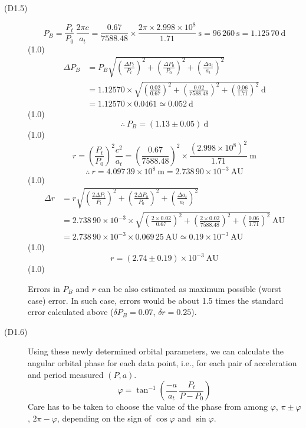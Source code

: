 \begin{description}
\item[(D1.5)]
  \[ P_B = \frac{P_t}{P_0}\,\frac{2\pi c}{a_t}
     = \frac{0.67}{7588.48} \times
       \frac{2\pi \times 2.998 \times 10^8}{1.71}\ \mathrm{s}
     = 96\,260\ \mathrm{s} = 1.125\,70\ \mathrm{d} \]
  \hfill(1.0)
  \begin{align*}
    \Delta P_B &= P_B \sqrt{
      \left( \frac{\Delta P_t}{P_t} \right)^2
      + \left( \frac{\Delta P_0}{P_0} \right)^2
      + \left( \frac{\Delta a_t}{a_t} \right)^2 } \\
    &= 1.12570 \times \sqrt{
      \left( \frac{0.02}{0.67} \right)^2
      + \left( \frac{0.02}{7588.48} \right)^2
      + \left( \frac{0.06}{1.71} \right)^2 }\ \mathrm{d} \\
    &= 1.12570 \times 0.0461 \simeq 0.052\ \mathrm{d}
  \end{align*}
  \hfill(1.0)
  \[ \therefore\ P_B = (1.13 \pm 0.05)\ \mathrm{d} \]
  \hfill(1.0)
  \[ r = \left( \frac{P_t}{P_0} \right)^2 \frac{c^2}{a_t}
     = \left( \frac{0.67}{7588.48} \right)^2 \times
       \frac{\left( 2.998 \times 10^8 \right)^2}{1.71}\ \mathrm{m} \]
  \[ \therefore\ r = 4.097\,39 \times 10^8\ \mathrm{m}
     = 2.738\,90 \times 10^{-3}\ \mathrm{AU} \]
  \hfill(1.0)
  \begin{align*}
    \Delta r &= r \sqrt{
      \left( \frac{2\Delta P_t}{P_t} \right)^2
      + \left( \frac{2\Delta P_0}{P_0} \right)^2
      + \left( \frac{\Delta a_t}{a_t} \right)^2 } \\
    &= 2.738\,90 \times 10^{-3} \times \sqrt{
      \left( \frac{2 \times 0.02}{0.67} \right)^2
      + \left( \frac{2 \times 0.02}{7588.48} \right)^2
      + \left( \frac{0.06}{1.71} \right)^2 }\ \mathrm{AU} \\
    &= 2.738\,90 \times 10^{-3} \times 0.069\,25\ \mathrm{AU}
      \simeq 0.19 \times 10^{-3}\ \mathrm{AU}
  \end{align*}
  \hfill(1.0)
  \[ r = (2.74 \pm 0.19) \times 10^{-3}\ \mathrm{AU} \]
  \hfill(1.0)

  Errors in $P_B$ and $r$ can be also estimated as maximum possible (worst
  case) error. In such case, errors would be about 1.5 times the standard
  error calculated above ($\delta P_B = 0.07$, $\delta r = 0.25$).

\item[(D1.6)] Using these newly determined orbital parameters, we can
  calculate the angular orbital phase for each data point, i.e., for each
  pair of acceleration and period measured $(P, a)$.
  \[ \varphi = \tan^{-1}\left( \frac{-a}{a_t}\,
     \frac{P_t}{P - P_0} \right) \]
  Care has to be taken to choose the value of the phase from among $\varphi$,
  $\pi \pm \varphi$, $2\pi - \varphi$, depending on the sign of $\cos\varphi$
  and $\sin\varphi$.


\end{description}
